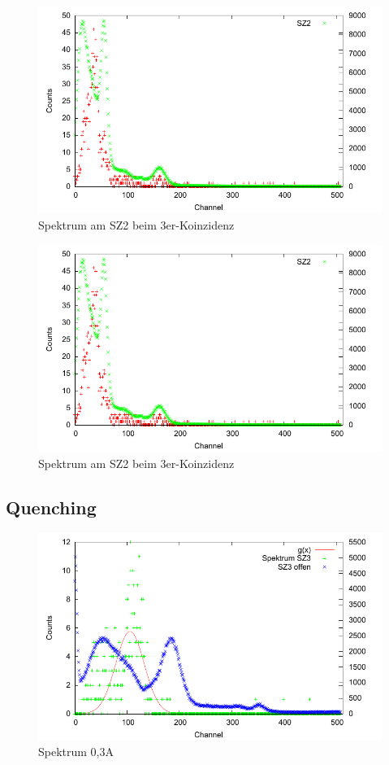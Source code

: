 \begin{figure}
 \includegraphics[width=\textwidth]{Graphen/3er/spektrum-1.pdf}
 \caption{Spektrum am SZ2 beim 3er-Koinzidenz}
\end{figure}

\begin{figure}
 \includegraphics[width=\textwidth]{Graphen/3er/spektrum-2.pdf}
 \caption{Spektrum am SZ2 beim 3er-Koinzidenz}
\end{figure}


\subsection{Quenching}

\begin{figure}
 \includegraphics[width=\textwidth]{Graphen/quench/spektrum_0-3.pdf}
 \caption{Spektrum 0,3A}
\end{figure}

